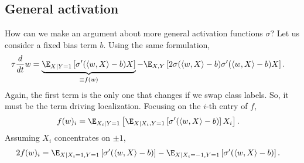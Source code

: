 \documentclass[usletter,twoside,12pt]{book}
\begin{document}
\subsection{General activation}
How can we make an argument about more general activation functions $\sigma$?
Let us consider a fixed bias term $b$.
Using the same formulation,
\begin{align}
   \tau \frac{d}{dt} w &= \underbrace{ \E_{X \mid Y=1} \left[ \sigma'( \langle w, X \rangle - b ) X \right] }_{\equiv f(w)} - \E_{X, Y} \left[ 2 \sigma(\langle w, X \rangle - b) \sigma'( \langle w, X \rangle - b ) X \right].
\end{align}
Again, the first term is the only one that changes if we swap class labels.
So, it must be the term driving localization.
Focusing on the $i$-th entry of $f$,
\begin{align}
   f(w)_i &= \E_{X_i \mid Y=1} \left[ \E_{X \mid X_i, Y=1} \left[ \sigma'( \langle w, X \rangle - b ) \right] X_i \right].
\end{align}
Assuming $X_i$ concentrates on $\pm 1$,
\begin{align}
   2 f(w)_i &= \E_{X \mid X_i=1, Y=1} \left[ \sigma'( \langle w, X \rangle - b ) \right] - \E_{X \mid X_i=-1, Y=1} \left[ \sigma'( \langle w, X \rangle - b ) \right].
\end{align}
\end{document}
